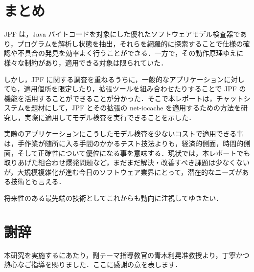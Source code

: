 \documentclass[a4j,12pt]{jarticle}
\begin{document}
\section{まとめ}

JPF は，Java バイトコードを対象にした優れたソフトウェアモデル検査器であり，プログラムを解析し状態を抽出，それらを網羅的に探索することで仕様の確認や不具合の発見を効率よく行うことができる．一方で，その動作原理ゆえに様々な制約があり，適用できる対象は限られていた．

しかし，JPF に関する調査を重ねるうちに，一般的なアプリケーションに対しても，適用個所を限定したり，拡張ツールを組み合わせたりすることで JPF の機能を活用することができることが分かった．そこで本レポートは，チャットシステムを題材にして，JPF とその拡張の net-iocache を適用するための方法を研究し，実際に適用してモデル検査を実行できることを示した．

実際のアプリケーションにこうしたモデル検査を少ないコストで適用できる事は，手作業が随所に入る手間のかかるテスト技法よりも，経済的側面，時間的側面，そして正確性について優位になる事を意味する．現状では，本レポートでも取りあげた組合わせ爆発問題など，まだまだ解決・改善すべき課題は少なくないが，大規模複雑化が進む今日のソフトウェア業界にとって，潜在的なニーズがある技術とも言える．

将来性のある最先端の技術としてこれからも動向に注視してゆきたい．



\section{謝辞}

本研究を実施するにあたり，副テーマ指導教官の青木利晃准教授より，丁寧かつ熱心なご指導を賜りました．ここに感謝の意を表します．



\end{document}
